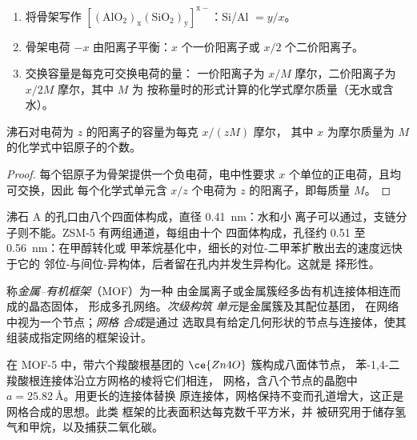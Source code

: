 \begin{method}[沸石的化学式与交换容量]\label{met:b3:inorganic-materials:zeolite-formula}
\begin{enumerate}
  \item 将骨架写作 $\mathrm{[(AlO_2)_x(SiO_2)_y]^{x-}}$：Si/Al $= y/x$。
  \item 骨架电荷 $-x$ 由阳离子平衡：$x$ 个一价阳离子或 $x/2$
        个二价阳离子。
  \item 交换容量是每克可交换电荷的量：
        一价阳离子为 $x/M$ 摩尔，二价阳离子为 $x/2M$ 摩尔，其中 $M$ 为
        按称量时的形式计算的化学式摩尔质量（无水或含水）。
\end{enumerate}
\end{method}

\begin{proposition}[交换容量]\label{prop:b3:inorganic-materials:exchange-capacity}
沸石对电荷为 $z$ 的阳离子的容量为每克 $x/(zM)$ 摩尔，
其中 $x$ 为摩尔质量为 $M$ 的化学式中铝原子的个数。
\end{proposition}

\begin{proof}
每个铝原子为骨架提供一个负电荷，电中性要求
$x$ 个单位的正电荷，且均可交换，因此
每个化学式单元含 $x/z$ 个电荷为 $z$ 的阳离子，即每质量 $M$。
\end{proof}

沸石 A 的孔口由八个四面体构成，直径 \qty{0.41}{nm}：水和小
离子可以通过，支链分子则不能。ZSM-5 有两组通道，每组由十个
四面体构成，孔径约 0.51 至 \qty{0.56}{nm}：在甲醇转化或
甲苯烷基化中，细长的对位-二甲苯扩散出去的速度远快于它的
邻位-与间位-异构体，后者留在孔内并发生异构化。这就是
择形性。

\begin{definition}[金属–有机框架]\label{def:b3:inorganic-materials:mof}
称\emph{金属–有机框架}（MOF）为一种
由金属离子或金属簇经多齿有机连接体相连而成的晶态固体，
形成多孔网络。\emph{次级构筑
单元}是金属簇及其配位基团，
在网络中视为一个节点；\emph{网格
合成}是通过
选取具有给定几何形状的节点与连接体，使其组装成指定网络的框架设计。
\end{definition}

在 MOF-5 中，带六个羧酸根基团的 $\ce{Zn4O}$ 簇构成八面体节点，
苯-1,4-二羧酸根连接体沿立方网格的棱将它们相连，
网格，含八个节点的晶胞中 $a = \qty{25.82}{\angstrom}$。用更长的连接体替换
原连接体，网格保持不变而孔道增大，这正是网格合成的思想。此类
框架的比表面积达每克数千平方米，并
被研究用于储存氢气和甲烷，以及捕获二氧化碳。

